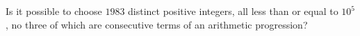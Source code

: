 Is it possible to choose $1983$ distinct positive integers, all less than or equal to $10^5$,  no three of which are consecutive terms of an arithmetic progression?